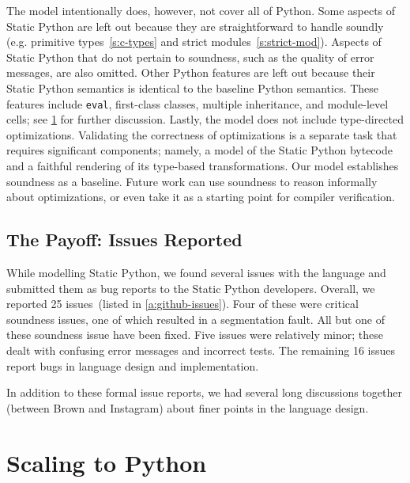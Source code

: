 \documentclass[english,cleveref,submission]{programming}
\newcommand{\SP}{Static Python}
\newcommand{\code}[1]{\texttt{#1}}
\begin{document}
The model intentionally does, however, not cover all of Python.
Some aspects of \SP{} are left out because they are straightforward to
handle soundly (e.g. primitive types~\cref{s:c-types} and strict modules~\cref{s:strict-mod}).
Aspects of \SP{} that do not pertain to soundness, such as the quality of error messages,
are also omitted.
Other Python features are left out because their \SP{} semantics is identical
to the baseline Python semantics.
These features include \code{eval}, first-class classes, multiple inheritance, and module-level cells;
see \cref{s:impl} for further discussion.
Lastly, the model does not include type-directed optimizations.
Validating the correctness of optimizations is a separate task that requires
significant components; namely, a model of the \SP{} bytecode and a faithful
rendering of its type-based transformations.
Our model establishes soundness as a baseline.
Future work can use soundness to reason informally about optimizations,
or even take it as a starting point for compiler verification.


\subsection{The Payoff: Issues Reported}

While modelling \SP{}, we found several issues with the language
and submitted them as bug reports to the \SP{} developers.
Overall, we reported 25 issues~(listed in \cref{a:github-issues}).
Four of these were critical soundness issues, one of which resulted in
a segmentation fault.
All but one of these soundness issue have been fixed.
Five issues were relatively minor; these dealt with confusing error messages
and incorrect tests.
The remaining 16 issues report bugs in language design and implementation.

In addition to these formal issue reports,
we had several long discussions together (between Brown and Instagram)
about finer points in the language design.



\section{Scaling to Python}
\label{s:impl}


\end{document}
